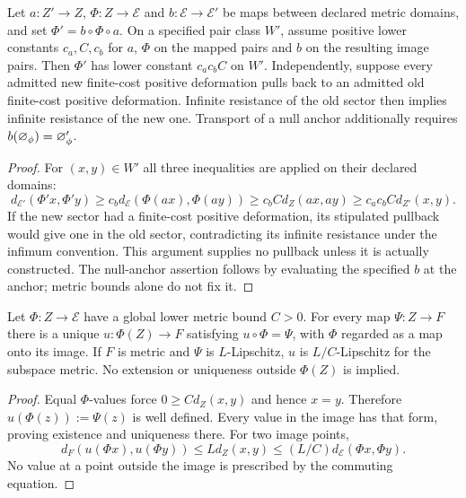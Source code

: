 \begin{theorem}\label{thm:rigidity-inheritance}
Let $a:Z'\to Z$, $\Phi:Z\to\mathcal E$ and $b:\mathcal E\to\mathcal E'$
be maps between declared metric domains, and set $\Phi'=b\circ\Phi\circ a$.
On a specified pair class $W'$, assume positive lower constants $c_a,C,c_b$
for $a$, $\Phi$ on the mapped pairs and $b$ on the resulting image pairs.
Then $\Phi'$ has lower constant $c_ac_bC$ on $W'$.
Independently, suppose every admitted new finite-cost positive deformation
pulls back to an admitted old finite-cost positive deformation. Infinite
resistance of the old sector then implies infinite resistance of the new one.
Transport of a null anchor additionally requires $b(\varnothing_\phi)=\varnothing_\phi'$.
\end{theorem}
\begin{proof}
For $(x,y)\in W'$ all three inequalities are applied on their declared domains:
\[
 d_{\mathcal E'}(\Phi'x,\Phi'y)
 \geq c_b d_{\mathcal E}(\Phi(ax),\Phi(ay))
 \geq c_bC d_Z(ax,ay)\geq c_ac_bC d_{Z'}(x,y).
\]
If the new sector had a finite-cost positive deformation, its stipulated
pullback would give one in the old sector, contradicting its infinite
resistance under the infimum convention. This argument supplies no pullback
unless it is actually constructed. The null-anchor assertion follows by
evaluating the specified $b$ at the anchor; metric bounds alone do not fix it.
\end{proof}

\begin{theorem}\label{thm:null-categorical-universality}
Let $\Phi:Z\to\mathcal E$ have a global lower metric bound $C>0$.
For every map $\Psi:Z\to F$ there is a unique $u:\Phi(Z)\to F$ satisfying
$u\circ\Phi=\Psi$, with $\Phi$ regarded as a map onto its image.
If $F$ is metric and $\Psi$ is $L$-Lipschitz, $u$ is $L/C$-Lipschitz
for the subspace metric. No extension or uniqueness outside $\Phi(Z)$ is implied.
\end{theorem}
\begin{proof}
Equal $\Phi$-values force $0\geq C d_Z(x,y)$ and hence $x=y$.
Therefore $u(\Phi(z)):=\Psi(z)$ is well defined. Every value in the image
has that form, proving existence and uniqueness there. For two image points,
\[
 d_F(u(\Phi x),u(\Phi y))\leq Ld_Z(x,y)
 \leq(L/C)d_{\mathcal E}(\Phi x,\Phi y).
\]
No value at a point outside the image is prescribed by the commuting equation.
\end{proof}

